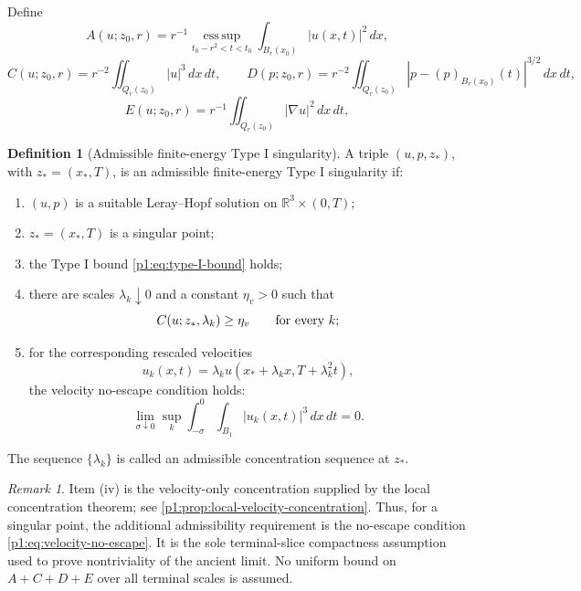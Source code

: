 \documentclass[11pt]{amsart}
\theoremstyle{plain}
\theoremstyle{definition}
\newtheorem{definition}[definition]{Definition}
\theoremstyle{remark}
\newtheorem{remark}[remark]{Remark}
\numberwithin{equation}{section}
\newcommand{\R}{\mathbb R}
\newcommand{\esssup}{\operatorname*{ess\,sup}}
\begin{document}
Define
\begin{equation}\label{p1:eq:C-D-def}
   A(u;z_0,r)=r^{-1}\esssup_{t_0-r^2<t<t_0}
   \int_{B_r(x_0)}|u(x,t)|^2\,dx,
\end{equation}
\begin{equation}\label{p1:eq:C-D-def-2}
   C(u;z_0,r)=r^{-2}\iint_{Q_r(z_0)}|u|^3\,dx\,dt,
   \qquad
   D(p;z_0,r)=r^{-2}\iint_{Q_r(z_0)}
   |p-(p)_{B_r(x_0)}(t)|^{3/2}\,dx\,dt,
\end{equation}
\begin{equation}\label{p1:eq:E-I-def}
   E(u;z_0,r)=r^{-1}\iint_{Q_r(z_0)}|\nabla u|^2\,dx\,dt,
\end{equation}
\begin{definition}[Admissible finite-energy Type I singularity]
\label{p1:def:admissible-type-I}
A triple \((u,p,z_*)\), with \(z_*=(x_*,T)\), is an admissible finite-energy
Type I singularity if:
\begin{enumerate}[label=(\roman*)]
\item \((u,p)\) is a suitable Leray--Hopf solution on
\(\R^3\times(0,T)\);
\item \(z_*=(x_*,T)\) is a singular point;
\item the Type I bound \eqref{p1:eq:type-I-bound} holds;
\item there are scales \(\lambda_k\downarrow0\) and a constant
\(\eta_v>0\) such that
\[
   C(u;z_*,\lambda_k)\ge\eta_v
   \qquad\hbox{for every }k;
\]
\item for the corresponding rescaled velocities
\[
   u_k(x,t)=\lambda_k u(x_*+\lambda_kx,T+\lambda_k^2t),
\]
the velocity no-escape condition holds:
\begin{equation}\label{p1:eq:velocity-no-escape}
   \lim_{\sigma\downarrow0}
   \sup_k
   \int_{-\sigma}^{0}\int_{B_1}|u_k(x,t)|^3\,dx\,dt=0 .
\end{equation}
\end{enumerate}
The sequence \(\{\lambda_k\}\) is called an admissible concentration sequence
at \(z_*\).
\end{definition}

\begin{remark}
Item (iv) is the velocity-only concentration supplied by the local
concentration theorem; see \cref{p1:prop:local-velocity-concentration}.  Thus,
for a singular point, the additional admissibility requirement is the
no-escape condition \eqref{p1:eq:velocity-no-escape}.  It is the sole
terminal-slice compactness assumption used to prove nontriviality of the
ancient limit.  No uniform bound on \(A+C+D+E\) over all terminal scales is
assumed.
\end{remark}
\end{document}
